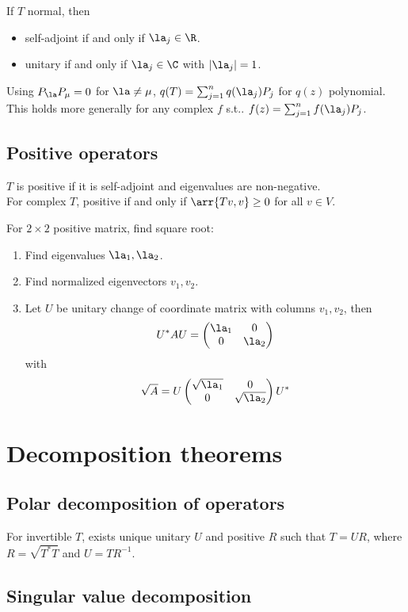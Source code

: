 \documentclass[10pt]{LatexTemplate/hw}
\begin{document}
\begin{multicols*}{2}
If $T$ normal, then 
\begin{itemize}
    \item self-adjoint if and only if $\la_j\in\R$.
    \item unitary if and only if $\la_j\in\C$ with $|\la_j|=1$.
\end{itemize}

Using $P_\la P_\mu=0$ for $\la\ne\mu$, $q(T)=\sum_{j=1}^n q(\la_j)P_j$ for $q(z)$ polynomial.\\
This holds more generally for any complex $f$ s.t.. $f(z)=\sum_{j=1}^n f(\la_j)P_j$.

\subsection{Positive operators}
$T$ is positive if it is self-adjoint and eigenvalues are non-negative.\\ 
For complex $T$, positive if and only if $\arr{Tv,v}\ge0$ for all $v\in V$.

For $2\times2$ positive matrix, find square root:
\begin{enumerate}
    \item Find eigenvalues $\la_1,\la_2$.
    \item Find normalized eigenvectors $v_1,v_2$.
    \item Let $U$ be unitary change of coordinate matrix with columns $v_1,v_2$, then $$U^*AU=\begin{pmatrix}
    \la_1 & 0 \\
    0 & \la_2
    \end{pmatrix}$$ with $$\sqrt{A}=U\begin{pmatrix}
    \sqrt{\la_1} & 0 \\
    0 & \sqrt{\la_2}
    \end{pmatrix}U^*$$
\end{enumerate}
\section{Decomposition theorems}
\subsection{Polar decomposition of operators}
For invertible $T$, exists unique unitary $U$ and positive $R$ such that $T=UR$, where $R=\sqrt{T^*T}$ and $U=TR^{-1}$.
\subsection{Singular value decomposition}

\end{multicols*}
\end{document}
